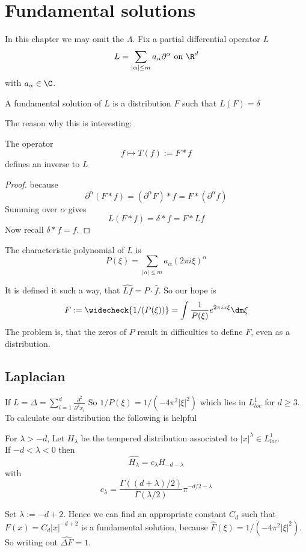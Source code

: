 \section{Fundamental solutions}
In this chapter we may omit the $\Lambda$.
Fix a partial differential operator $L$
\[
L = \sum_{|\alpha|\le m } a_\alpha \partial^\alpha \text { on } \R^d
\]
with $a_\alpha \in \C$.
\begin{definition}
	A fundamental solution of $L$ is a distribution $F$ such that $L(F) = \delta$
\end{definition}
The reason why this is interesting:
\begin{lemma}
	The operator
	\[
	f \mapsto T(f) := F * f
	\]
	defines an inverse to $L$
\end{lemma}
\begin{proof}
	because
	\[
	\partial^\alpha (F * f) = (\partial^\alpha F) * f = F * (\partial^\alpha f)
	\]
	Summing over $\alpha$ gives
	\[
	L(F * f) = \delta * f  = F * L f
	\]
	Now recall $\delta * f = f$.
\end{proof}
\begin{definition}
	The characteristic polynomial of $L$ is
	\[P(\xi) = \sum_{|\alpha|\le m} a_\alpha (2 \pi i \xi)^\alpha\]
\end{definition}
It is defined it such a way, that $\widehat{L f} = P \cdot \hat f$.
So our hope is
\[F := \widecheck{1 / (P (\xi))} = \int \frac{1}{P(\xi)} e^{2 \pi i x \xi} \dm \xi\]
The problem is, that the zeros of $P$ result in difficulties to define $F$, even as a distribution.
\subsection{Laplacian}
If $L = \Delta = \sum_{i=1}^d \frac{\partial^2}{\partial^2 x_i}$
So $1 / P (\xi) = 1 / (-4 \pi^2 |\xi|^2) $ which lies in $L^1_{loc}$ for $d \ge 3$.
To calculate our distribution the following is helpful
\begin{theorem}
	For $\lambda > -d$, Let $H_\lambda$ be the tempered distribution associated to $|x|^\lambda \in L^1_{loc}$. \\
	If $-d  < \lambda < 0$  then
	\[
	\widehat {H_\lambda} = c_\lambda H_{-d-\lambda}
	\]
	with
	\[
	c_\lambda = \frac{\Gamma((d + \lambda)/2)}{\Gamma(\lambda / 2)} \pi^{-d/2-\lambda}
	\]
\end{theorem}
Set $\lambda:=-d+2$. Hence we can find an appropriate constant $C_d$ such that $F(x) = C_d |x|^{-d +2}$ is a fundamental solution, because $\hat {F}(\xi) = 1 / (-4\pi^2|\xi|^2)$. So writing out $\widehat{\Delta F} = 1$. \\

